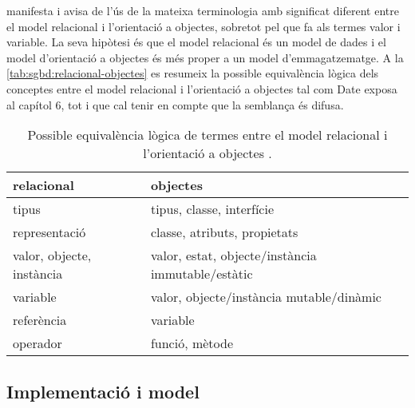 \textcite[cap.~6]{date06} manifesta i avisa de l'ús de la mateixa
terminologia amb significat diferent entre el model relacional i
l'orientació a objectes, sobretot pel que fa als termes valor i
variable. %
La seva hipòtesi és que el model relacional és un model de dades i el
model d'orientació a objectes és més proper a un model
d'emmagatzematge. %
A la \autoref{tab:sgbd:relacional-objectes} es resumeix la possible
equivalència lògica dels conceptes entre el model relacional i
l'orientació a objectes tal com Date exposa al capítol 6, tot i que
cal tenir en compte que la semblança és difusa.


\begin{table}
\centering
\begin{tabular}[ht]{ll}
  relacional & objectes \\\hline \hline
  tipus & tipus, classe, interfície \\\hline
  representació & classe, atributs, propietats \\\hline
  valor, objecte, instància & valor, estat, objecte/instància immutable/estàtic \\\hline
  variable & valor, objecte/instància mutable/dinàmic \\\hline
  referència & variable \\\hline
  operador & funció, mètode \\\hline
\end{tabular}
\caption{Possible equivalència lògica de termes entre el model relacional i l'orientació a objectes \parencite[cap.~6]{date06}.}
\label{tab:sgbd:relacional-objectes}
\end{table}




\subsection{Implementació i model}


